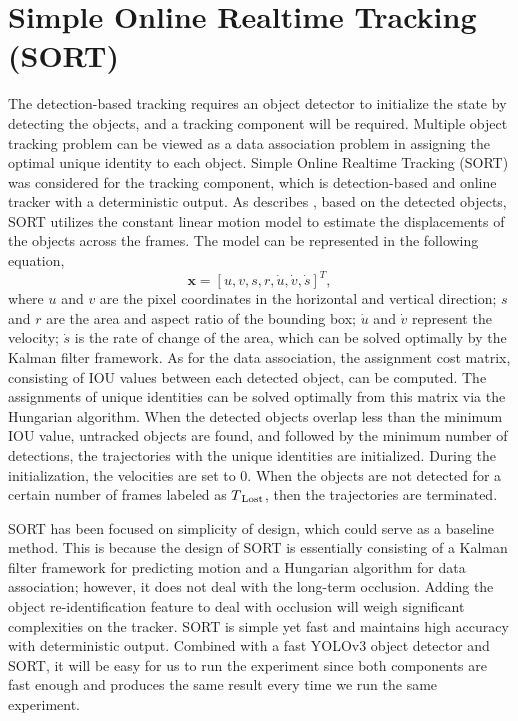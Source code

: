 \section{Simple Online Realtime Tracking (SORT)}
\label{sec:background/section_b}

The detection-based tracking requires an object detector to initialize the state by detecting the objects, and a tracking component will be required. Multiple object tracking problem can be viewed as a data association problem in assigning the optimal unique identity to each object. Simple Online Realtime Tracking (SORT) was considered for the tracking component, which is detection-based and online tracker with a deterministic output. As \citeauthor{bewley_simple_2016} describes \cite{bewley_simple_2016}, based on the detected objects, SORT utilizes the constant linear motion model to estimate the displacements of the objects across the frames. The model can be represented in the following equation,
\begin{equation}
\textbf{x} = [u, v, s, r, \dot{u}, \dot{v}, \dot{s}]^T,
\label{eq:SORT_model}
\end{equation}
where $u$ and $v$ are the pixel coordinates in the horizontal and vertical direction; $s$ and $r$ are the area and aspect ratio of the bounding box; $\dot{u}$ and $\dot{v}$ represent the velocity; $\dot{s}$ is the rate of change of the area, which can be solved optimally by the Kalman filter framework. As for the data association, the assignment cost matrix, consisting of IOU values between each detected object, can be computed. The assignments of unique identities can be solved optimally from this matrix via the Hungarian algorithm. When the detected objects overlap less than the minimum IOU value, untracked objects are found, and followed by the minimum number of detections, the trajectories with the unique identities are initialized. During the initialization, the velocities are set to 0. When the objects are not detected for a certain number of frames labeled as $T\textsubscript{Lost}$, then the trajectories are terminated.

SORT has been focused on simplicity of design, which could serve as a baseline method. This is because the design of SORT is essentially consisting of a Kalman filter framework for predicting motion and a Hungarian algorithm for data association; however, it does not deal with the long-term occlusion. Adding the object re-identification feature to deal with occlusion will weigh significant complexities on the tracker. SORT is simple yet fast and maintains high accuracy with deterministic output. Combined with a fast YOLOv3 object detector and SORT, it will be easy for us to run the experiment since both components are fast enough and produces the same result every time we run the same experiment.